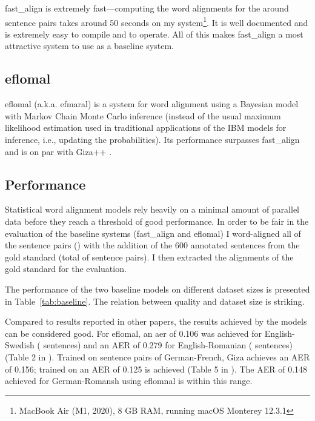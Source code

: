 fast\_align is extremely fast---computing the word alignments for the around  sentence pairs takes around 50 seconds on my system\footnote{MacBook Air (M1, 2020), 8 GB RAM, running macOS Monterey 12.3.1}. 
It is well documented and is extremely easy to compile and to operate. 
All of this makes fast\_align a most attractive system to use as a baseline system.

\subsection{eflomal}
eflomal (a.k.a. efmaral\footnotemark) is a system for word alignment using a Bayesian model with Markov Chain Monte Carlo inference (instead of the usual maximum likelihood estimation used in traditional applications of the IBM models for inference, i.e., updating the probabilities). 
Its performance surpasses fast\_align and is on par with Giza++ \autocite{Ostling2016efmaral}.



\subsection{Performance}
Statistical word alignment models rely heavily  on a minimal amount of parallel data before they reach a threshold of good performance. In order to be fair in the evaluation of the baseline systems (fast\_align and eflomal) I word-aligned all of the sentence pairs () with  the addition of the 600 annotated sentences from the gold standard (total of  sentence pairs). I then extracted the alignments of the gold standard for the evaluation.
 

The performance of the two baseline models on different dataset sizes is presented in Table~\ref{tab:baseline}. The relation between quality and dataset size is striking. 

Compared to  results reported in other papers, the results achieved by the models can be considered good. 
For eflomal,  an \acrshort{aer} of 0.106  was achieved for English-Swedish ( sentences) and an AER of 0.279 for English-Romanian ( sentences) (Table 2 in \textcite{Ostling2016efmaral}). 
Trained on  sentence pairs of German-French, Giza achieves an AER of 0.156; trained on  an AER of 0.125 is achieved (Table 5 in \textcite{och-ney-2000-improved}). 
The AER of 0.148 achieved for German-Romansh using eflomnal is within this range.



